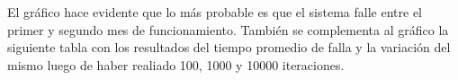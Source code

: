 \documentclass[10pt,a4paper]{article} %
\begin{document}
                                                                                                                                                                                                                                                                                                                                                                                                                                                    El gr\'afico hace evidente que lo m\'as probable es que el
                                                                                                                                                                                                                                                                                                                                                                                                                                                    sistema falle entre el primer y segundo mes de funcionamiento.
                                                                                                                                                                                                                                                                                                                                                                                                                                                    Tambi\'en se complementa al gr\'afico la siguiente tabla
                                                                                                                                                                                                                                                                                                                                                                                                                                                    con los resultados del tiempo promedio de falla y la
                                                                                                                                                                                                                                                                                                                                                                                                                                                    variaci\'on del mismo luego de haber realiado 100, 1000 y
                                                                                                                                                                                                                                                                                                                                                                                                                                                    10000 iteraciones.
\end{document}
